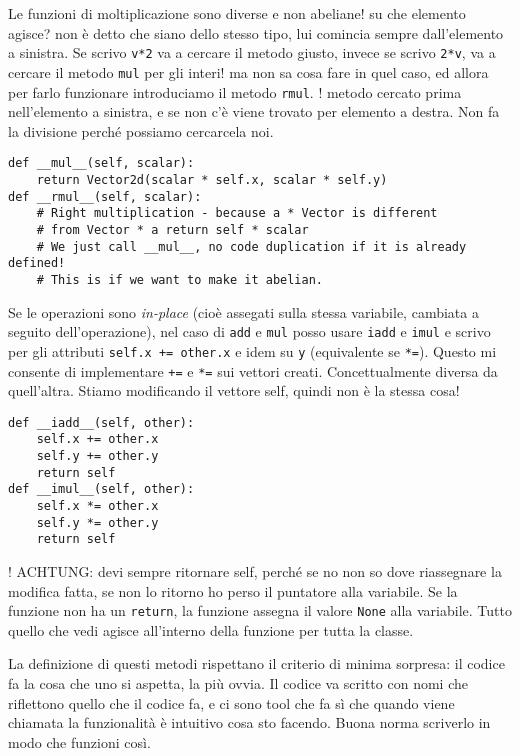 \documentclass[10pt, a4paper, titlepage]{book}
\begin{document}
Le funzioni di moltiplicazione sono diverse e non abeliane! su che elemento agisce? non è detto che siano dello stesso tipo, lui comincia sempre dall'elemento a sinistra.
Se scrivo \texttt{v*2} va a cercare il metodo giusto, invece se scrivo \texttt{2*v}, va a cercare il metodo \texttt{mul} per gli interi! ma non sa cosa fare in quel caso, ed allora per farlo funzionare introduciamo il metodo \texttt{rmul}. ! metodo cercato prima nell'elemento a sinistra, e se non c'è viene trovato per elemento a destra. Non fa la divisione perché possiamo cercarcela noi.
\begin{verbatim}
def __mul__(self, scalar):
	return Vector2d(scalar * self.x, scalar * self.y)
def __rmul__(self, scalar):
	# Right multiplication - because a * Vector is different 
	# from Vector * a return self * scalar 
	# We just call __mul__, no code duplication if it is already defined!
	# This is if we want to make it abelian.
\end{verbatim}

Se le operazioni sono \textit{in-place} (cioè assegati sulla stessa variabile, cambiata a seguito dell'operazione), nel caso di \texttt{add} e \texttt{mul} posso usare \texttt{iadd} e \texttt{imul} e scrivo per gli attributi \texttt{self.x += other.x} e idem su \texttt{y} (equivalente se \texttt{*=}). Questo mi consente di implementare \texttt{+=} e \texttt{*=} sui vettori creati.
Concettualmente diversa da quell'altra. Stiamo modificando il vettore self, quindi non è la stessa cosa!
\begin{verbatim}
def __iadd__(self, other):
	self.x += other.x
	self.y += other.y
	return self
def __imul__(self, other):
	self.x *= other.x
	self.y *= other.y
	return self
\end{verbatim}

! ACHTUNG: devi sempre ritornare self, perché se no non so dove riassegnare la modifica fatta, se non lo ritorno ho perso il puntatore alla variabile. Se la funzione non ha un \texttt{return}, la funzione assegna il valore \texttt{None} alla variabile. Tutto quello che vedi agisce all'interno della funzione per tutta la classe.

La definizione di questi metodi rispettano il criterio di minima sorpresa: il codice fa la cosa che uno si aspetta, la più ovvia.
Il codice va scritto con nomi che riflettono quello che il codice fa, e ci sono tool che fa sì che quando viene chiamata la funzionalità è intuitivo cosa sto facendo. Buona norma scriverlo in modo che funzioni così.
\end{document}
